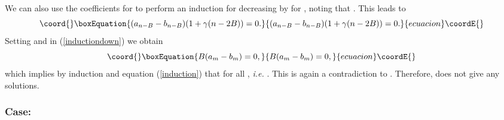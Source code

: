 \documentclass[a4paper,12pt]{article}
\begin{document}
We can also use the coefficients for \coordHE{} to  
perform an induction for decreasing 
\coordHE{} by \coordHE{} for \coordHE{}, noting that \coordHE{}. This leads 
to
%
\begin{equation}\coord{}\boxEquation{
\label{inductiondown}
(a_{n-B} - b_{n-B})(1 + \gamma (n - 2B)) = 0.
}{
(a_{n-B} - b_{n-B})(1 + \gamma (n - 2B)) = 0.
}{ecuacion}\coordE{}\end{equation}
%
Setting \coordHE{} and \coordHE{} in (\ref{inductiondown}) we obtain
%
\begin{equation}\coord{}\boxEquation{
B(a_m - b_m) = 0,
}{
B(a_m - b_m) = 0,
}{ecuacion}\coordE{}\end{equation}
%
which implies by induction and equation (\ref{induction}) that
\coordHE{} for all \coordHE{}, {\it i.e.} \coordHE{}. This  is 
again a contradiction to \coordHE{}. Therefore, \coordHE{} does not give any 
solutions.

\subsubsection*{Case: \coordHE{}}
\end{document}

